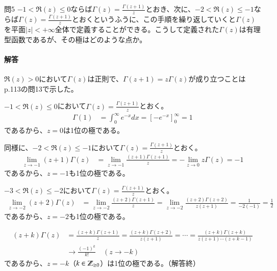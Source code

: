 \begin{mysimplebox}{問5}
    $-1<\Re(z)\le0$ならば$\Gamma(z)=\frac{\Gamma(z+1)}{z}$とおき、次に、$-2<\Re(z)\le-1$ならば$\Gamma(z)=\frac{\Gamma(z+1)}{z}$とおくというふうに、この手順を繰り返していくと$\Gamma(z)$を平面$|z|<+\infty$全体で定義することができる。こうして定義された$\Gamma(z)$は有理型函数であるが、その極はどのような点か。
\end{mysimplebox}
\paragraph{解答}
$\Re(z)>0$において$\Gamma(z)$は正則で、$\Gamma(z+1)=z\Gamma(z)$が成り立つことはp.113の問13で示した。

$-1<\Re(z)\le0$において$\Gamma(z)=\frac{\Gamma(z+1)}{z}$とおく。
\begin{align*}
    \Gamma(1)
    &=\int_{0}^{\infty}e^{-x}dx=\left[-e^{-x}\right]_0^\infty=1
\end{align*}
であるから、$z=0$は1位の極である。

同様に、$-2<\Re(z)\le-1$において$\Gamma(z)=\frac{\Gamma(z+1)}{z}$とおく。
\begin{align*}
    \lim_{z\longrightarrow-1}(z+1)\Gamma(z)
    &=\lim_{z\longrightarrow-1}\frac{(z+1)\Gamma(z+1)}{z}
    =-\lim_{z\longrightarrow0}z\Gamma(z)=-1
\end{align*}
であるから、$z=-1$も1位の極である。

$-3<\Re(z)\le-2$において$\Gamma(z)=\frac{\Gamma(z+1)}{z}$とおく。
\begin{align*}
    \lim_{z\longrightarrow-2}(z+2)\Gamma(z)
    &=\lim_{z\longrightarrow-2}\frac{(z+2)\Gamma(z+1)}{z}
    =\lim_{z\longrightarrow-2}\frac{(z+2)\Gamma(z+2)}{z(z+1)}=\frac{1}{-2(-1)}=\frac{1}{2}
\end{align*}
であるから、$z=-2$も1位の極である。

\begin{align*}
    (z+k)\Gamma(z)
    &=\frac{(z+k)\Gamma(z+1)}{z}
    =\frac{(z+k)\Gamma(z+2)}{z(z+1)}
    =\cdots=\frac{(z+k)\Gamma(z+k)}{z(z+1)\cdots(z+k-1)}\\
    &\longrightarrow \frac{(-1)^k}{k!}\quad(z\longrightarrow-k)
\end{align*}
であるから、$z=-k$（$k\in\mathbb{Z}_{\ge0}$）は1位の極である。（解答終）

